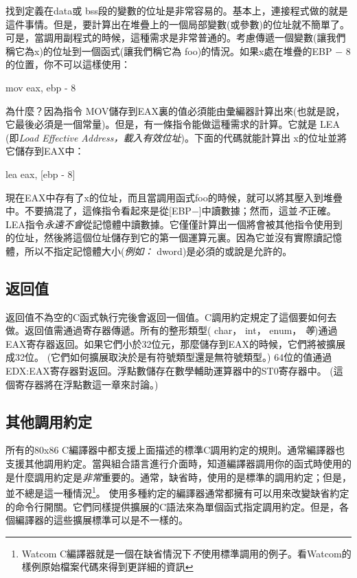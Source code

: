 找到定義在{\code data}或{\code
bss}段的變數的位址是非常容易的。基本上，連接程式做的就是這件事情。但是，要計算出在堆疊上的一個局部變數(或參數)的位址就不簡單了。可是，當調用副程式的時候，這種需求是非常普通的。考慮傳遞一個變數(讓我們稱它為{\code x})的位址到一個函式(讓我們稱它為
{\code foo})的情況。如果{\code x}處在堆疊的EBP $-$ 8的位置，你不可以這樣使用：
\begin{AsmCodeListing}[numbers=none,frame=none]
      mov    eax, ebp - 8
\end{AsmCodeListing}
為什麼？因為指令{\code
MOV}儲存到EAX裏的值必須能由彙編器計算出來(也就是說，它最後必須是一個常量)。但是，有一條指令能做這種需求的計算。它就是
{\code LEA}  (即\emph{Load Effective
Address，載入有效位址})。下面的代碼就能計算出{\code
x}的位址並將它儲存到EAX中：
\begin{AsmCodeListing}[numbers=none,frame=none]
      lea    eax, [ebp - 8]
\end{AsmCodeListing}
現在EAX中存有了{\code x}的位址，而且當調用函式{\code foo}的時候，就可以將其壓入到堆疊中。不要搞混了，這條指令看起來是從[EBP\nolinebreak$-$]中讀數據；然而，這並\emph{不}正確。{\code LEA}指令\emph{永遠不會}從記憶體中讀數據。它僅僅計算出一個將會被其他指令使用到的位址，然後將這個位址儲存到它的第一個運算元裏。因為它並沒有實際讀記憶體，所以不指定記憶體大小(\emph{例如：}
{\code dword})是必須的或說是允許的。


\subsection{返回值}

返回值不為空的C函式執行完後會返回一個值。C調用約定規定了這個要如何去做。返回值需通過寄存器傳遞。所有的整形類型({\code
char}， {\code int}， {\code enum}，
\emph{等})通過EAX寄存器返回。如果它們小於32位元，那麼儲存到EAX的時候，它們將被擴展成32位。
(它們如何擴展取決於是有符號類型還是無符號類型。)
64位的值通過EDX:EAX寄存器對返回。浮點數儲存在數學輔助運算器中的ST0寄存器中。
(這個寄存器將在浮點數這一章來討論。) 

\subsection{其他調用約定}

所有的80x86
C編譯器中都支援上面描述的標準C調用約定的規則。通常編譯器也支援其他調用約定。當與組合語言進行介面時，知道編譯器調用你的函式時使用的是什麼調用約定是\emph{非常}重要的。通常，缺省時，使用的是標準的調用約定；但是，並不總是這一種情況\footnote{Watcom
C編譯器就是一個在缺省情況下\emph{不}使用標準調用的例子。看Watcom的樣例原始檔案代碼來得到更詳細的資訊}。
使用多種約定的編譯器通常都擁有可以用來改變缺省約定的命令行開關。它們同樣提供擴展的C語法來為單個函式指定調用約定。但是，各個編譯器的這些擴展標準可以是不一樣的。

